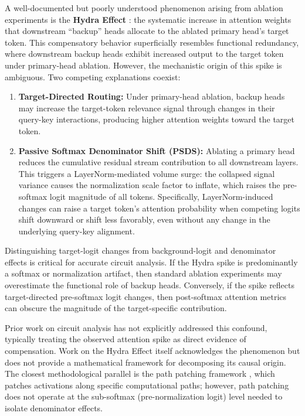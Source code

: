\documentclass[12pt,a4paper]{article}
\begin{document}
A well-documented but poorly understood phenomenon arising from ablation
experiments is the \textbf{Hydra Effect} \citep{mcgrath2023hydra}: the
systematic increase in attention weights that downstream ``backup'' heads
allocate to the ablated primary head's target token. This compensatory behavior
superficially resembles functional redundancy, where downstream backup heads exhibit
increased output to the target token under primary-head ablation. However, the mechanistic
origin of this spike is ambiguous.
Two competing explanations coexist:

\begin{enumerate}
  \item \textbf{Target-Directed Routing:} Under primary-head ablation, backup heads may increase the target-token relevance signal through changes in their query-key interactions, producing higher attention weights toward the target token.
  
  \item \textbf{Passive Softmax Denominator Shift (PSDS):} Ablating a primary
    head reduces the cumulative residual stream contribution to all downstream
    layers. This triggers a LayerNorm-mediated volume surge: the collapsed signal
    variance causes the normalization scale factor to inflate, which raises the
    pre-softmax logit magnitude of all tokens. Specifically, LayerNorm-induced changes can raise a target token’s attention probability when competing logits shift downward or shift less favorably, even without any change in the underlying query-key alignment.
\end{enumerate}

Distinguishing target-logit changes from background-logit and denominator effects is critical for accurate circuit analysis. If the Hydra spike is predominantly a softmax or normalization artifact, then standard ablation experiments may overestimate the functional role of backup heads. Conversely, if the spike reflects target-directed pre-softmax logit changes, then post-softmax attention metrics can obscure the magnitude of the target-specific contribution.

Prior work on circuit analysis \citep{conmy2023automated, goldowsky2023localizing}
has not explicitly addressed this confound, typically treating the observed
attention spike as direct evidence of compensation. Work on the Hydra Effect
itself \citep{mcgrath2023hydra} acknowledges the phenomenon but does not provide
a mathematical framework for decomposing its causal origin. The closest
methodological parallel is the path patching framework \citep{goldowsky2023localizing},
which patches activations along specific computational paths; however, path
patching does not operate at the sub-softmax (pre-normalization logit) level
needed to isolate denominator effects.
\end{document}
